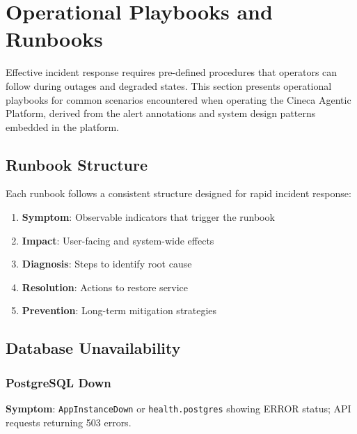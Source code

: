 
\section{Operational Playbooks and Runbooks}
\label{sec:runbooks}

Effective incident response requires pre-defined procedures that operators can follow during outages and degraded states. This section presents operational playbooks for common scenarios encountered when operating the Cineca Agentic Platform, derived from the alert annotations and system design patterns embedded in the platform.

\subsection{Runbook Structure}

Each runbook follows a consistent structure designed for rapid incident response:

\begin{enumerate}
    \item \textbf{Symptom}: Observable indicators that trigger the runbook
    \item \textbf{Impact}: User-facing and system-wide effects
    \item \textbf{Diagnosis}: Steps to identify root cause
    \item \textbf{Resolution}: Actions to restore service
    \item \textbf{Prevention}: Long-term mitigation strategies
\end{enumerate}

\subsection{Database Unavailability}

\subsubsection{PostgreSQL Down}

\textbf{Symptom}: \texttt{AppInstanceDown} or \texttt{health.postgres} showing ERROR status; API requests returning 503 errors.

